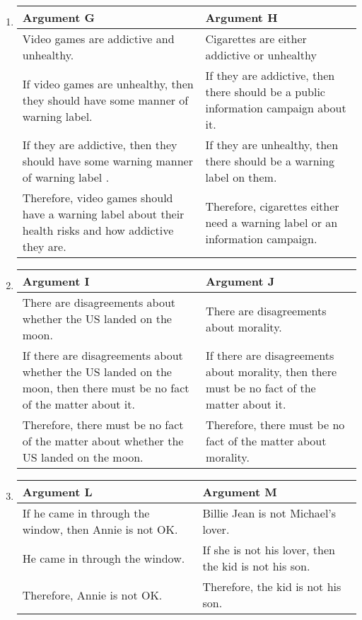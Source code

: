 \begin{enumerate}
\item

\begin{tabular}{p{4.8cm}|p{4.8cm}}
	Argument G&Argument H\\\hline
	Video games are addictive and unhealthy. & Cigarettes are either addictive or unhealthy\\
	If video games are unhealthy, then they should have some manner of warning label. & If they are addictive, then there should be a public information campaign about it.\\
	If they are addictive, then they should have some warning manner of warning label . & If they are unhealthy, then there should be a warning label on them.\\
	Therefore, video games should have a warning label about their health risks and how addictive they are.& Therefore, cigarettes either need a warning label or an information campaign.\\
	\end{tabular} 

\item

\begin{tabular}{p{4.8cm}|p{4.8cm}}
	Argument I&Argument J\\\hline
	There are disagreements about whether the US landed on the moon. & There are disagreements about morality.\\
	If there are disagreements about whether the US landed on the moon, then there must be no fact of the matter about it. &If there are disagreements about morality, then there must be no fact of the matter about it.\\
	Therefore, there must be no fact of the matter about whether the US landed on the moon. & Therefore, there must be no fact of the matter about morality.\\
	\end{tabular} 

\item

\begin{tabular}{p{4.8cm}|p{4.8cm}}
	Argument L&Argument M\\\hline
	If he came in through the window, then Annie is not OK. & Billie Jean is not Michael's lover.\\
	He came in through the window. &If she is not his lover, then the kid is not his son.\\
	Therefore, Annie is not OK. & Therefore, the kid is not his son.\\
	\end{tabular} 
\end{enumerate}

